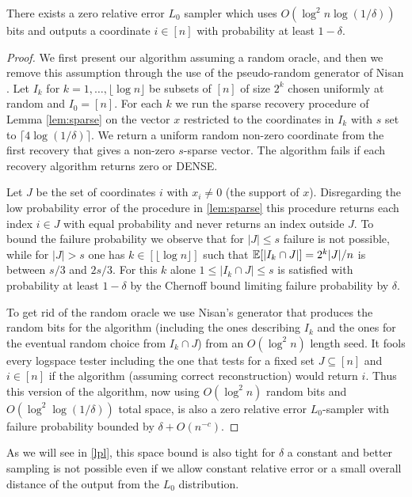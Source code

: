 \begin{theorem}
\label{l0}
There exists a zero relative error $L_0$ sampler which
 uses $O(\log^2 n\log(1/\delta))$ bits and outputs a 
 coordinate $i\in[n]$ with probability at least $1-\delta$.
\end{theorem}
\begin{proof}
We first present our algorithm assuming a random oracle, and
then we remove this assumption through the use of the
pseudo-random generator of Nisan \cite{Nisan1990}. Let $I_k$ for
$k=1,\ldots,\lfloor\log n\rfloor$ be subsets of $[n]$ of size
$2^k$ chosen uniformly at random and $I_0=[n]$. For each $k$ we
run the sparse recovery procedure of Lemma \ref{lem:sparse} on
the vector $x$ restricted to the coordinates in $I_k$ with $s$
set to $\lceil4\log(1/\delta)\rceil$. We return a uniform random
non-zero coordinate from the first recovery that gives a
non-zero $s$-sparse vector. The algorithm fails if each recovery
algorithm returns zero or DENSE.

Let $J$ be the set of coordinates $i$ with $x_i\ne0$ (the
support of $x$). Disregarding the low probability error of the
procedure in \autoref{lem:sparse} this procedure returns each
index $i\in J$ with equal probability and never returns an index
outside $J$. To bound the failure probability we observe that
for $|J|\le s$ failure is not possible, while for $|J|>s$ one
has $k\in[\lfloor\log n\rfloor]$ such that $\operatorname*{\mathbb{E}}[|I_k\cap
J|]=2^k|J|/n$ is between $s/3$ and $2s/3$. For this $k$ alone
$1\le|I_k\cap J|\le s$ is satisfied with probability at least
$1-\delta$ by the Chernoff bound limiting failure probability by
$\delta$.

  To get rid of the random oracle we use Nisan's generator \cite{Nisan1990} that
  produces the random bits for the algorithm (including the ones describing
  $I_k$ and the ones for the eventual random choice from $I_k\cap J$) from an
  $O(\log^2 n)$ length seed. It fools every logspace tester including the one
  that tests for a fixed set $J\subseteq[n]$ and $i\in[n]$ if the algorithm
  (assuming correct reconstruction) would return $i$. Thus this version of the
  algorithm, now using $O(\log^2n)$ random bits and $O(\log^2\log(1/\delta))$
  total space, is also a zero relative error $L_0$-sampler with failure
  probability bounded by $\delta+O(n^{-c})$.
\end{proof}

As we will see in \autoref{lpl}, this space bound is also tight for
$\delta$ a constant and better sampling is not possible even if we allow
constant relative error or a small overall distance of the output from the
$L_0$ distribution.
